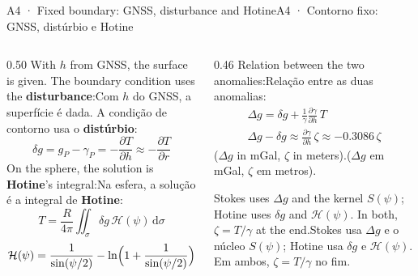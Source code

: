 \documentclass[aspectratio=169,11pt]{beamer}
\newcommand{\tr}[2]{\ifEN#2\else#1\fi}
\begin{document}
\begin{frame}{\tr{A4 · Contorno fixo: GNSS, distúrbio e Hotine}{A4 · Fixed boundary: GNSS,
  disturbance and Hotine}}
  \small
  \begin{columns}[T]
    \begin{column}{0.50\textwidth}
      \tr{Com $h$ do GNSS, a superfície é dada. A condição de contorno usa o
      \textbf{distúrbio}:}{With $h$ from GNSS, the surface is given. The boundary condition
      uses the \textbf{disturbance}:}
      \[ \delta g = g_P - \gamma_P = -\frac{\partial T}{\partial h} \approx
         -\frac{\partial T}{\partial r} \]
      \tr{Na esfera, a solução é a integral de \textbf{Hotine}:}{On the sphere, the solution
      is \textbf{Hotine}'s integral:}
      \[ T = \frac{R}{4\pi}\iint_\sigma \delta g\, \mathcal{H}(\psi)\,\mathrm{d}\sigma \]
      \[ \mathcal{H}(\psi) = \frac{1}{\sin(\psi/2)} - \ln\Bigl(1 + \frac{1}{\sin(\psi/2)}
         \Bigr) \]
    \end{column}
    \begin{column}{0.46\textwidth}
      \tr{Relação entre as duas anomalias:}{Relation between the two anomalies:}
      \begin{gather*}
        \Delta g = \delta g + \frac{1}{\gamma}\frac{\partial\gamma}{\partial h}\,T \\
        \Delta g - \delta g \approx \frac{\partial\gamma}{\partial h}\,\zeta
        \approx -\num{0.3086}\,\zeta
      \end{gather*}
      \tr{($\Delta g$ em mGal, $\zeta$ em metros).}{($\Delta g$ in mGal, $\zeta$ in meters).}
      \medskip
      \begin{ideia}
        \scriptsize\tr{Stokes usa $\Delta g$ e o núcleo $S(\psi)$; Hotine usa $\delta g$ e
        $\mathcal{H}(\psi)$. Em ambos, $\zeta = T/\gamma$ no fim.}{Stokes uses $\Delta g$ and
        the kernel $S(\psi)$; Hotine uses $\delta g$ and $\mathcal{H}(\psi)$. In both, $\zeta
        = T/\gamma$ at the end.}
      \end{ideia}
    \end{column}
  \end{columns}
\end{frame}
\end{document}
